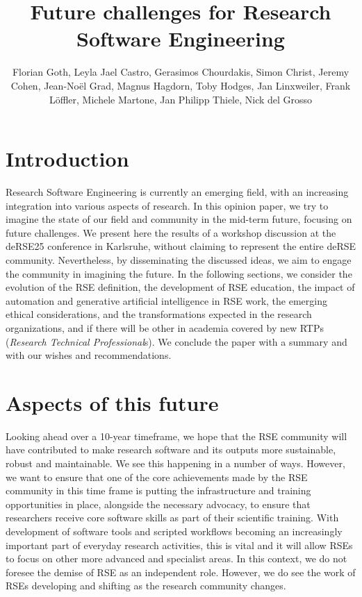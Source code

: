 \documentclass{eceasst}
\title{Future challenges for Research Software Engineering} %
\author{
Florian Goth\texorpdfstring{\autref{1}}{},
Leyla Jael Castro\texorpdfstring{\autref{1}}{},
Gerasimos Chourdakis\texorpdfstring{\autref{1}}{},
Simon Christ\texorpdfstring{\autref{1}}{},
Jeremy Cohen\texorpdfstring{\autref{1}}{},
Jean-Noël Grad\texorpdfstring{\autref{1}}{},
Magnus Hagdorn\texorpdfstring{\autref{1}}{},
Toby Hodges\texorpdfstring{\autref{1}}{},
Jan Linxweiler\texorpdfstring{\autref{1}}{},
Frank Löffler\texorpdfstring{\autref{1}}{},
Michele Martone\texorpdfstring{\autref{1}}{},
Jan Philipp Thiele\texorpdfstring{\autref{1}}{},
Nick del Grosso\texorpdfstring{\autref{1}}{}
} %
\institute{\autlabel{1} Fantasy University} %
\begin{document}
\maketitle

\section{Introduction}

Research Software Engineering is currently an emerging field,
with an increasing integration into various aspects of research.
In this opinion paper, we try to imagine the state of our field
and community in the mid-term future, focusing on future challenges.
We present here the results of a workshop discussion at the
deRSE25 conference in Karlsruhe\cite{Goth2025EndRSEng}, without
claiming to represent the entire deRSE community.
Nevertheless, by disseminating the discussed ideas,
we aim to engage the community in imagining the future.
In the following sections, we consider the evolution of the RSE definition,
the development of RSE education,
the impact of automation and generative artificial intelligence in RSE work,
the emerging ethical considerations,
and the transformations expected in the research organizations,
and if there will be other in academia covered by new RTPs (\emph{Research Technical Professional}s).
We conclude the paper with a summary and with our wishes and recommendations.

\section{Aspects of this future}
Looking ahead over a 10-year timeframe, we hope that the RSE community will have
contributed to make research software and its outputs
more sustainable, robust and maintainable. We see this happening in a number of ways. However,
we want to ensure that one of the core achievements made by the RSE community in this time
frame is putting the infrastructure and training opportunities in place, alongside the necessary
advocacy, to ensure that researchers receive core software skills as part of their scientific training.
With development of software tools and scripted workflows becoming an increasingly important part of everyday
research activities, this is vital and it will allow RSEs to focus on other more advanced and specialist
areas. In this context, we do not foresee the demise of RSE as an independent role. However, we
do see the work of RSEs developing and shifting as the research community changes.
\end{document}
